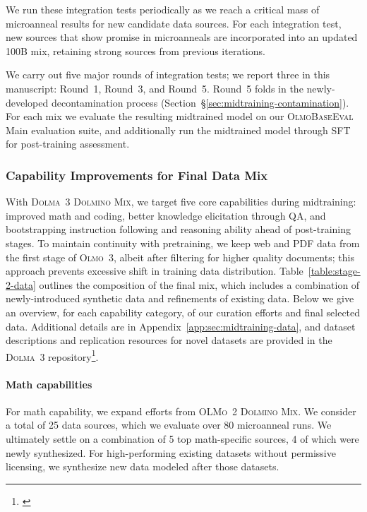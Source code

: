 \documentclass[table]{ai2style/ai2}
\newcommand{\oldOlmo}{OLMo\xspace}
\newcommand{\newOlmo}{Olmo\xspace}
\newcommand{\olmothree}{\textsc{\newOlmo~3}\xspace}
\newcommand{\roundOne}{{Round~1}\xspace}
\newcommand{\roundThree}{{Round~3}\xspace}
\newcommand{\roundFive}{{Round~5}\xspace}
\newcommand{\dolmatoo}{\textsc{Dolma~3}\xspace}
\newcommand{\dolminos}{\textsc{\oldOlmo~2 Dolmino Mix}\xspace}
\newcommand{\dolminostoo}{\textsc{Dolma~3 Dolmino Mix}\xspace}
\newcommand{\olmothreeeval}{\textsc{OlmoBaseEval}\xspace}
\begin{document}
We run these integration tests periodically as we reach a critical mass of microanneal results for new candidate data sources. 
For each integration test, new sources that show promise in microanneals are incorporated into an updated 100B mix, retaining strong sources from previous iterations.

We carry out five major rounds of integration tests; we report three in this manuscript: \roundOne, \roundThree, and \roundFive. 
\roundFive folds in the newly-developed decontamination process (Section~\S\ref{sec:midtraining-contamination}). 
For each mix we evaluate the resulting midtrained model on our \olmothreeeval Main evaluation suite, and additionally run the midtrained model through SFT for post-training assessment.

\subsubsection{Capability Improvements for Final Data Mix}

With \dolminostoo, we target five core capabilities during midtraining: improved math and coding, better knowledge elicitation through QA, and bootstrapping instruction following and reasoning ability ahead of post-training stages. 
To maintain continuity with pretraining, we keep web and PDF data from the first stage of \olmothree, albeit after filtering for higher quality documents; 
this approach prevents excessive shift in training data distribution.
Table~\ref{table:stage-2-data} outlines the composition of the final mix, which includes a combination of newly-introduced synthetic data and refinements of existing data. 
Below we give an overview, for each capability category, of our curation efforts and final selected data. Additional details are in Appendix~\ref{app:sec:midtraining-data}, and dataset descriptions and replication resources for novel datasets are provided in the \dolmatoo repository\footnote{\href{https://github.com/allenai/dolma3}{}}.

\paragraph{Math capabilities}

For math capability, we expand efforts from \dolminos. 
We consider a total of 25 data sources, which we evaluate over 80 microanneal runs. 
We ultimately settle on a combination of 5 top math-specific sources, 4 of which were newly synthesized. 
For high-performing existing datasets without permissive licensing, we synthesize new data modeled after those datasets.
\end{document}
